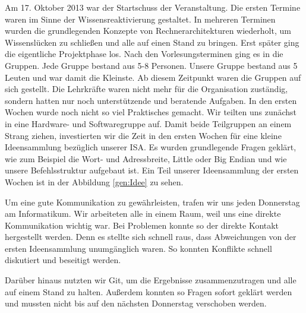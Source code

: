Am 17. Oktober 2013 war der Startschuss der Veranstaltung. Die ersten Termine waren im Sinne der Wissensreaktivierung gestaltet. In mehreren Terminen wurden die grundlegenden Konzepte 
von Rechnerarchitekturen wiederholt, um Wissenslücken zu schließen und alle auf einen Stand zu bringen. Erst später ging die eigentliche Projektphase los.
Nach den Vorlesungsterminen ging es in die Gruppen. Jede Gruppe bestand aus 5-8 Personen. Unsere Gruppe bestand aus 5 Leuten und war damit die Kleinste. Ab diesem Zeitpunkt waren die Gruppen auf sich gestellt. Die Lehrkräfte waren nicht mehr für die Organisation zuständig, sondern hatten nur noch unterstützende und beratende Aufgaben.
In den ersten Wochen wurde noch nicht so viel Praktisches gemacht. Wir teilten uns zunächst in eine Hardware- und Softwaregruppe auf. Damit beide Teilgruppen an einem Strang ziehen, investierten wir die Zeit in den ersten Wochen für eine kleine Ideensammlung bezüglich unserer ISA. 
Es wurden grundlegende Fragen geklärt, wie zum Beispiel die Wort- und Adressbreite, Little oder Big Endian und wie unsere Befehlsstruktur aufgebaut ist. Ein Teil unserer Ideensammlung der ersten Wochen ist in der Abbildung \autoref{gen:Idee} zu sehen.

Um eine gute Kommunikation zu gewährleisten, trafen wir uns jeden Donnerstag am Informatikum. Wir arbeiteten alle in einem Raum, weil uns eine direkte Kommunikation wichtig war. Bei Problemen konnte so der direkte Kontakt hergestellt werden. Denn es stellte sich schnell raus, dass Abweichungen von der ersten Ideensammlung unumgänglich waren. So konnten Konflikte schnell diskutiert und beseitigt werden.

Darüber hinaus nutzten wir Git, um die Ergebnisse zusammenzutragen und alle auf einem Stand zu halten. Außerdem konnten so Fragen sofort geklärt werden und mussten nicht bis auf den nächsten Donnerstag verschoben werden.

